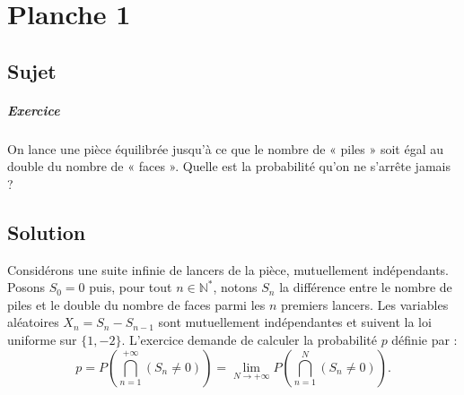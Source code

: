 \chapter{Planche 1}

\section{Sujet}

\paragraph{Exercice}

On lance une pièce équilibrée jusqu'à ce que le nombre de « piles » soit égal au double du nombre de « faces ». Quelle est la probabilité qu'on ne s'arrête jamais ?

\section{Solution}


Considérons une suite infinie de lancers de la pièce, mutuellement indépendants. Posons $S_0 = 0$ puis, pour tout $n \in \mathbb N^*$, notons $S_n$ la différence entre le nombre de piles et le double du nombre de faces parmi les $n$ premiers lancers. Les variables aléatoires $X_n = S_n - S_{n-1}$ sont mutuellement indépendantes et suivent la loi uniforme sur $\{1,-2\}$. L'exercice demande de calculer la probabilité $p$ définie par :
\[
p = P\left(\bigcap_{n=1}^{+\infty} (S_n \neq 0)\right) = \lim_{N\to+\infty} P\left(\bigcap_{n=1}^N (S_n \neq 0)\right).
\]

